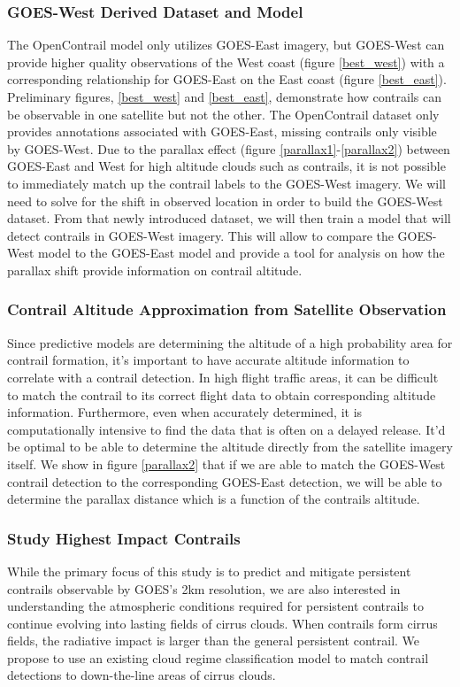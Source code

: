 \subsubsection{GOES-West Derived Dataset and Model}
The OpenContrail model only utilizes GOES-East imagery, but GOES-West can provide higher quality observations of the West coast (figure \ref{best_west}) with a corresponding relationship for GOES-East on the East coast (figure \ref{best_east}). Preliminary figures, \ref{best_west} and \ref{best_east}, demonstrate how contrails can be observable in one satellite but not the other. The OpenContrail dataset only provides annotations associated with GOES-East, missing contrails only visible by GOES-West. Due to the parallax effect (figure \ref{parallax1}-\ref{parallax2}) between GOES-East and West for high altitude clouds such as contrails, it is not possible to immediately match up the contrail labels to the GOES-West imagery. We will need to solve for the shift in observed location in order to build the GOES-West dataset. From that newly introduced dataset, we will then train a model that will detect contrails in GOES-West imagery. This will allow to compare the GOES-West model to the GOES-East model and provide a tool for analysis on how the parallax shift provide information on contrail altitude.

\subsubsection{Contrail Altitude Approximation from Satellite Observation}
Since predictive models are determining the altitude of a high probability area for contrail formation, it's important to have accurate altitude information to correlate with a contrail detection. In high flight traffic areas, it can be difficult to match the contrail to its correct flight data to obtain corresponding altitude information. Furthermore, even when accurately determined, it is computationally intensive to find the data that is often on a delayed release. It'd be optimal to be able to determine the altitude directly from the satellite imagery itself. We show in figure \ref{parallax2} that if we are able to match the GOES-West contrail detection to the corresponding GOES-East detection, we will be able to determine the parallax distance which is a function of the contrails altitude.

\subsubsection{Study Highest Impact Contrails}
While the primary focus of this study is to predict and mitigate persistent contrails observable by GOES's 2km resolution, we are also interested in understanding the atmospheric conditions required for persistent contrails to continue evolving into lasting fields of cirrus clouds. When contrails form cirrus fields, the radiative impact is larger than the general persistent contrail. We propose to use an existing cloud regime classification model to match contrail detections to down-the-line areas of cirrus clouds. 


